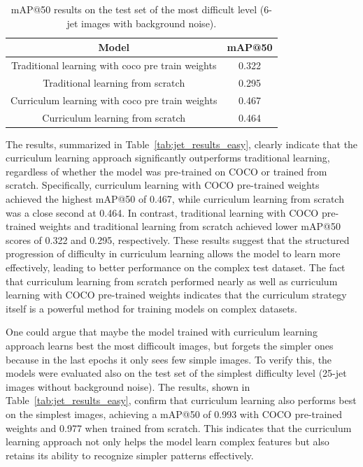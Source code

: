 \begin{table}[!ht]
    \centering
    \begin{tabular}{cc}
    \toprule
    \textbf{Model} & \textbf{mAP@50} \\
    \midrule 
    Traditional learning with coco pre train weights & 0.322 \\
    Traditional learning from scratch & 0.295 \\
    \rowcolor[HTML]{CBCEFB}
    Curriculum learning with coco pre train weights & 0.467 \\
    Curriculum learning from scratch & 0.464 \\
    \bottomrule
    \end{tabular}
    \caption{mAP@50 results on the test set of the most difficult level (6-jet images with background noise).}
    \label{tab:jet_results_hard}
\end{table}
The results, summarized in Table~\ref{tab:jet_results_easy}, clearly indicate that the curriculum learning approach significantly outperforms traditional learning, regardless of whether the model was pre-trained on COCO or trained from scratch. Specifically, curriculum learning with COCO pre-trained weights achieved the highest mAP@50 of 0.467, while curriculum learning from scratch was a close second at 0.464. In contrast, traditional learning with COCO pre-trained weights and traditional learning from scratch achieved lower mAP@50 scores of 0.322 and 0.295, respectively.
These results suggest that the structured progression of difficulty in curriculum learning allows the model to learn more effectively, leading to better performance on the complex test dataset. The fact that curriculum learning from scratch performed nearly as well as curriculum learning with COCO pre-trained weights indicates that the curriculum strategy itself is a powerful method for training models on complex datasets.

One could argue that maybe the model trained with curriculum learning approach learns best the most difficoult images, but forgets the simpler ones because in the last epochs it only sees few simple images. To verify this, the models were evaluated also on the test set of the simplest difficulty level (25-jet images without background noise). The results, shown in Table~\ref{tab:jet_results_easy}, confirm that curriculum learning also performs best on the simplest images, achieving a mAP@50 of 0.993 with COCO pre-trained weights and 0.977 when trained from scratch. This indicates that the curriculum learning approach not only helps the model learn complex features but also retains its ability to recognize simpler patterns effectively.


